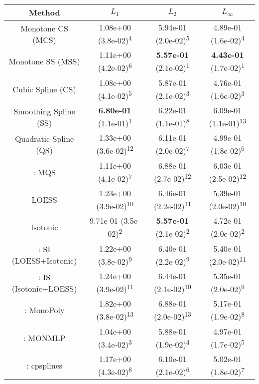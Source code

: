 \begin{tabular}{cccc}
\toprule
Method&$L_1$&$L_2$&$L_\infty$\tabularnewline
\midrule
Monotone CS (MCS)& 1.08e+00 (3.8e-02)\textsuperscript{4}& 5.94e-01 (2.0e-02)\textsuperscript{5}& 4.89e-01 (1.6e-02)\textsuperscript{4}\tabularnewline
Monotone SS (MSS)& 1.11e+00 (4.2e-02)\textsuperscript{6}& \textbf{5.57e-01} (2.1e-02)\textsuperscript{1}& \textbf{4.43e-01} (1.7e-02)\textsuperscript{1}\tabularnewline
Cubic Spline (CS)& 1.08e+00 (4.1e-02)\textsuperscript{5}& 5.87e-01 (2.1e-02)\textsuperscript{3}& 4.76e-01 (1.6e-02)\textsuperscript{3}\tabularnewline
Smoothing Spline (SS)& \textbf{6.80e-01} (1.1e-01)\textsuperscript{1}& 6.22e-01 (1.1e-01)\textsuperscript{8}& 6.09e-01 (1.1e-01)\textsuperscript{13}\tabularnewline
Quadratic Spline (QS)& 1.33e+00 (3.6e-02)\textsuperscript{12}& 6.11e-01 (2.0e-02)\textsuperscript{7}& 4.99e-01 (1.8e-02)\textsuperscript{6}\tabularnewline
\textcite{heMonotoneBsplineSmoothing1998}: MQS& 1.11e+00 (4.1e-02)\textsuperscript{7}& 6.88e-01 (2.7e-02)\textsuperscript{12}& 6.03e-01 (2.5e-02)\textsuperscript{12}\tabularnewline
LOESS& 1.23e+00 (3.9e-02)\textsuperscript{10}& 6.46e-01 (2.2e-02)\textsuperscript{11}& 5.39e-01 (2.0e-02)\textsuperscript{10}\tabularnewline
Isotonic& 9.71e-01 (3.5e-02)\textsuperscript{2}& \textbf{5.57e-01} (2.1e-02)\textsuperscript{2}& 4.72e-01 (2.0e-02)\textsuperscript{2}\tabularnewline
\textcite{mammenEstimatingSmoothMonotone1991}: SI (LOESS+Isotonic)& 1.22e+00 (3.8e-02)\textsuperscript{9}& 6.40e-01 (2.2e-02)\textsuperscript{9}& 5.40e-01 (2.0e-02)\textsuperscript{11}\tabularnewline
\textcite{mammenEstimatingSmoothMonotone1991}: IS (Isotonic+LOESS)& 1.24e+00 (3.9e-02)\textsuperscript{11}& 6.44e-01 (2.1e-02)\textsuperscript{10}& 5.35e-01 (2.0e-02)\textsuperscript{9}\tabularnewline
\textcite{murrayFastFlexibleMethods2016}: MonoPoly& 1.82e+00 (3.8e-02)\textsuperscript{13}& 6.88e-01 (2.0e-02)\textsuperscript{13}& 5.17e-01 (1.9e-02)\textsuperscript{8}\tabularnewline
\textcite{cannonMonmlpMultilayerPerceptron2017}: MONMLP& 1.04e+00 (3.4e-02)\textsuperscript{3}& 5.88e-01 (1.9e-02)\textsuperscript{4}& 4.97e-01 (1.7e-02)\textsuperscript{5}\tabularnewline
\textcite{navarro-garciaConstrainedSmoothingOutofrange2023}: cpsplines& 1.17e+00 (4.3e-02)\textsuperscript{8}& 6.10e-01 (2.1e-02)\textsuperscript{6}& 5.02e-01 (1.8e-02)\textsuperscript{7}\tabularnewline
\bottomrule
\end{tabular}
